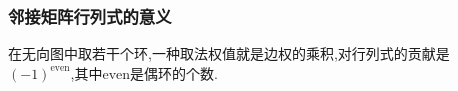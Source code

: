 \subsubsection{邻接矩阵行列式的意义}
在无向图中取若干个环,一种取法权值就是边权的乘积,对行列式的贡献是$(-1)^{\mathrm{even}}$,其中$\mathrm{even}$是偶环的个数.

